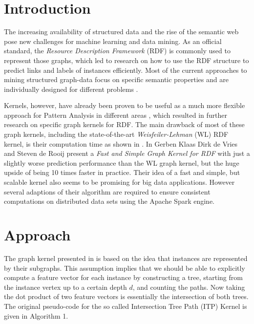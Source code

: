 \documentclass{easychair}
\begin{document}
\section{Introduction}
\label{sect:Introduction}
The increasing availability of structured data and the rise of the semantic web pose new challenges for machine learning and data mining. As an official standard, the \textit{Resource Description Framework} (RDF) is commonly used to represent those graphs, which led to research on how to use the RDF structure to predict links and labels of instances efficiently. Most of the current approaches to mining structured graph-data focus on specific semantic properties and are individually designed for different problems \cite{Rettinger2009, Huang2011}.

Kernels, however, have already been proven to be useful as a much more flexible approach for Pattern Analysis in different areas \cite{Shawe-Taylor2004}, which resulted in further research on specific graph kernels for RDF. The main drawback of most of these graph kernels, including the state-of-the-art \textit{Weisfeiler-Lehman} (WL) RDF kernel, is their computation time as shown in \cite{deVries2013}. In \cite{FGK} Gerben Klaas Dirk de Vries and Steven de Rooij present a \textit{Fast and Simple Graph Kernel for RDF} with just a slightly worse prediction performance than the WL graph kernel, but the huge upside of being 10 times faster in practice. Their idea of a fast and simple, but scalable kernel also seems to be promising for big data applications. However several adaptions of their algorithm are required to ensure consistent computations on distributed data sets using the Apache Spark engine.

\section{Approach}
\label{sect:Approach}

The graph kernel presented in \cite{FGK} is based on the idea that instances are represented by their subgraphs. This assumption implies that we should be able to explicitly compute a feature vector for each instance by constructing a tree, starting from the instance vertex up to a certain depth $d$, and counting the paths. Now taking the dot product of two feature vectors is essentially the intersection of both trees. The original pseudo-code for the so called Intersection Tree Path (ITP) Kernel is given in Algorithm 1.
\end{document}
